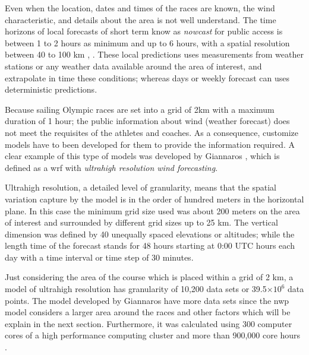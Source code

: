Even when the location, dates and times of the races are known, the wind characteristic, and details about the area is not well understand. The time horizons of local forecasts of short term know as \textit{nowcast} for public access is between 1 to 2 hours as minimum and up to 6 hours, with a spatial resolution between 40 to 100 km \cite{warner2010numerical}, \cite{kristensen2010weather}. These local predictions uses measurements from weather stations or any weather data available around the area of interest, and extrapolate in time these conditions;
whereas days or weekly forecast can uses deterministic predictions.\par
Because sailing Olympic races are set into a grid of 2km with a maximum duration of 1 hour; the public information about wind (weather forecast) does not meet the requisites of the athletes and coaches. As a consequence, customize models have to been developed for them to provide the information required. A clear example of this type of models was developed by Giannaros \cite{giannaros2018ultrahigh}, which is defined as a \acrshort{wrf} with \textit{ultrahigh resolution wind forecasting}.\par 
Ultrahigh resolution, a detailed level of granularity, means that the spatial variation capture by the model is in the order of hundred meters in the horizontal plane. In this case the minimum grid size used was about 200 meters on the area of interest and surrounded by different grid sizes up to 25 km. The vertical dimension was defined by 40 unequally spaced elevations or altitudes; while the length time of the forecast stands for 48 hours starting at 0:00 UTC hours each day with a time interval or time step of 30 minutes. \par \noindent 
Just considering the area of the course which is placed within a grid of 2 km, a model of ultrahigh resolution has granularity of 10,200 data sets or 39.5$\times 10^6$ data points. The model developed by Giannaros have more data sets since the \acrshort{nwp} model considers a larger area around the races and other factors which will be explain in the next section. Furthermore, it
was calculated using 300 computer cores of a high performance computing cluster and more than 900,000 core hours \cite{giannaros2018ultrahigh}. 

